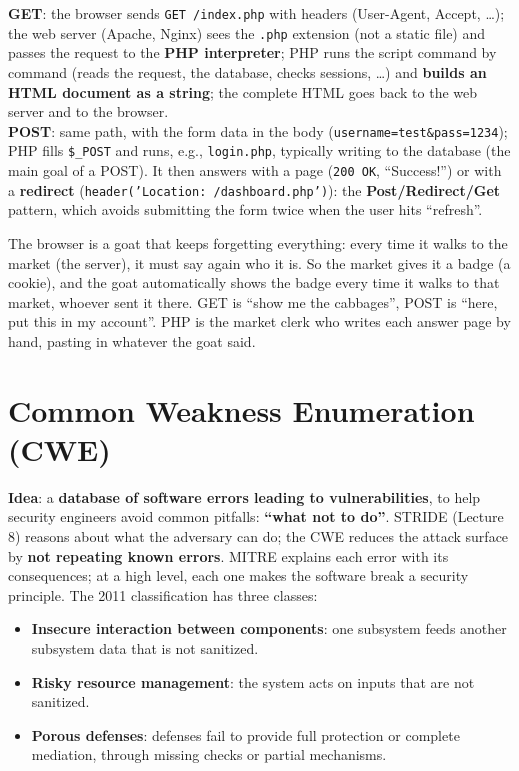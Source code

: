\begin{defnbox}[title={Lifetime of a request on a PHP server}]
\textbf{GET}: the browser sends \texttt{GET /index.php} with headers (User-Agent, Accept, \ldots);
the web server (Apache, Nginx) sees the \texttt{.php} extension (not a static file) and passes the
request to the \textbf{PHP interpreter}; PHP runs the script command by command (reads the request,
the database, checks sessions, \ldots) and \textbf{builds an HTML document as a string}; the
complete HTML goes back to the web server and to the browser. \\
\textbf{POST}: same path, with the form data in the body (\texttt{username=test\&pass=1234}); PHP
fills \texttt{\$\_POST} and runs, e.g., \texttt{login.php}, typically writing to the database (the
main goal of a POST). It then answers with a page (\texttt{200 OK}, ``Success!'') or with a
\textbf{redirect} (\texttt{header('Location: /dashboard.php')}): the
\textbf{Post/Redirect/Get} pattern, which avoids submitting the form twice when the user hits
``refresh''.
\end{defnbox}

\begin{goatbox}
The browser is a goat that keeps forgetting everything: every time it walks to the market (the
server), it must say again who it is. So the market gives it a badge (a cookie), and the goat
automatically shows the badge every time it walks to that market, whoever sent it there. GET is
``show me the cabbages'', POST is ``here, put this in my account''. PHP is the market clerk who
writes each answer page by hand, pasting in whatever the goat said.
\end{goatbox}

\section{Common Weakness Enumeration (CWE)}

\begin{defnbox}[title={Common Weakness Enumeration}]
\textbf{Idea}: a \textbf{database of software errors leading to vulnerabilities}, to help security
engineers avoid common pitfalls: \textbf{``what not to do''}. STRIDE (Lecture 8) reasons about what
the adversary can do; the CWE reduces the attack surface by \textbf{not repeating known errors}.
MITRE explains each error with its consequences; at a high level, each one makes the software
break a security principle. The 2011 classification has three classes:
\begin{itemize}
  \item \textbf{Insecure interaction between components}: one subsystem feeds another subsystem
        data that is not sanitized.
  \item \textbf{Risky resource management}: the system acts on inputs that are not sanitized.
  \item \textbf{Porous defenses}: defenses fail to provide full protection or complete mediation,
        through missing checks or partial mechanisms.
\end{itemize}
\end{defnbox}

